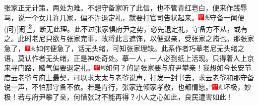 张家正无计策，两处为难。不想守备家听了此信，也不管青红皂白，便来作践辱骂，说一个女儿许几家，偏不许退定礼，就要打官司告状起来。{{\includegraphics[width=3mm]{../Images/00002}\includegraphics[width=3mm]{../Images/00012}\footnotesize \kaishu 守备一闻便{(问)}{[}闹{]}}}\href{../Text/part0019_split_000.html\#lnkback_2_a}{\textsuperscript{②}}{，断无此理。此不过张家惧府尹之势，必先退定礼，守备方不从，或有之。此时老尼只欲与张家完事，故将此言遮饰，以便退亲，受张家之贿也。}那张家急了，{\includegraphics[width=3mm]{../Images/00002}\includegraphics[width=3mm]{../Images/00012}\footnotesize \kaishu 如何便急了，话无头绪，可知张家理缺。此系作者巧摹老尼无头绪之语，莫认作者无头绪，正是神处奇处。摹一人，一人必到纸上活现。}只得着人上京来寻门路，赌气偏要退定礼。{\includegraphics[width=3mm]{../Images/00002}\includegraphics[width=3mm]{../Images/00011}\footnotesize \kaishu 如何？的是张家要与府尹攀亲！}我想如今长安节度云老爷与府上最契，可以求太太与老爷说声，打发一封书去，求云老爷和那守备说一声，不怕那守备不依。若是肯行，张家连倾家孝敬，也都情愿。''{\includegraphics[width=3mm]{../Images/00002}\includegraphics[width=3mm]{../Images/00012}\footnotesize \kaishu 坏极，妙极！若与府尹攀了亲，何惜张财不能再得？小人之心如此，良民遭害如此！}


